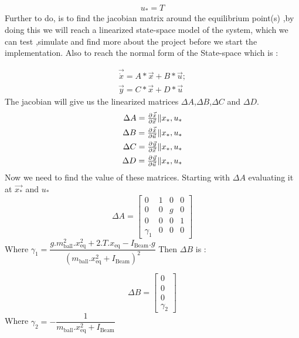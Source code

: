 \begin{equation}
	\begin{split}
		u_* = T
	\end{split}
\end{equation}
Further to do, is to find the jacobian matrix around the equilibrium point(s) ,by doing this we will reach a linearized state-space model of the system,
which we can test ,simulate and find more about the project before we start the implementation.
Also to reach the normal form of the State-space which is :

\begin{equation}
	\begin{split}
		\vec{\dot{x}} = A*\vec{x} + B*\vec{u};\\
		\vec{y}  = C*\vec{x} + D*\vec{u}
	\end{split}
\end{equation}
The jacobian will give us the linearized matrices $\Delta A$,$\Delta B$,$\Delta C$ and $\Delta D$.
\begin{equation}
	\begin{split}
		\Delta A = \pd{\vec{\dot{x}}}{\vec{x}}\|x_*,u_*\\
		\Delta B = \pd{\vec{\dot{x}}}{\vec{u}}\|x_*,u_*\\
		\Delta C = \pd{\vec{y}}{\vec{x}}\|x_*,u_* \\
		\Delta D = \pd{\vec{y}}{\vec{u}}\|x_*,u_*
	\end{split}
\end{equation}
Now we need to find the value of these matrices.
Starting with $\Delta A$ evaluating it at $\vec{x_*}$ and $u_*$
\begin{equation}
	\Delta A =
	\begin{bmatrix}
		0 &1 &0 &0\\
		0 &0 & g &0\\
		0 &0 &0 &1 \\
		\gamma_1 & 0 & 0 & 0
	\end{bmatrix}
\end{equation}
Where $\gamma_1 = \dfrac{g.m_{\text{ball}}^2.x_{\text{eq}}^2 + 2.T.x_{\text{eq}}- I_{\text{Beam}}.g}{(m_{\text{ball}}.x_{\text{eq}}^2 + I_{\text{Beam}})^2}$
\newpage
Then $\Delta B$ is :

\begin{equation}
	\Delta B =
	\begin{bmatrix}
		0 \\
		0 \\
		0 \\
		\gamma_2
	\end{bmatrix}
\end{equation}
Where $ \gamma_2 = - \dfrac{1}{m_{\text{ball}}.x_{\text{eq}}^2 + I_{\text{Beam}}}$

